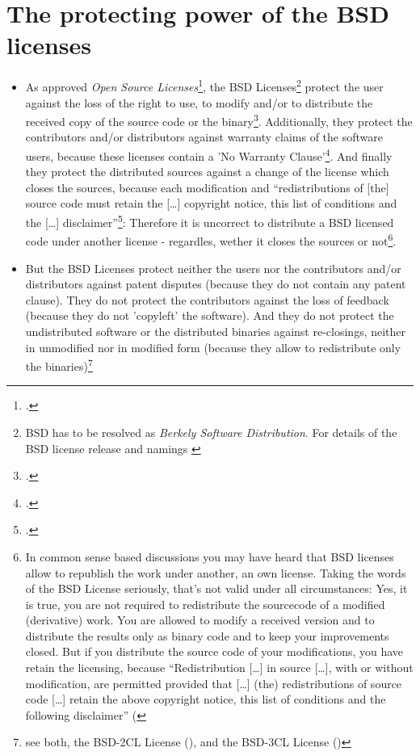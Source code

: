\section{The protecting power of the BSD licenses}
\begin{itemize}
  \item As approved \emph{Open Source Licenses}\footcite[cf.][\nopage
  wp]{OSI2012b}, the BSD Licenses\footnote{BSD has to be resolved as
  \emph{Berkely Software Distribution}. For details of the BSD license release
  and namings \cite[cf.][\nopage wp. editorial]{BsdLicense3Clause}} protect the
  user against the loss of the right to use, to modify and/or to distribute the
  received copy of the source code or the binary\footcite[cf.][\nopage wp
  §1ff]{OSI2012a}. Additionally, they protect the contributors and/or
  distributors against warranty claims of the software users, because these
  licenses contain a 'No Warranty Clause'\footcite[one for all version
  cf.][\nopage wp]{BsdLicense2Clause}. And finally they protect the distributed
  sources against a change of the license which closes the sources, because each
  modification and \enquote{redistributions of [the] source code must retain the
  [\ldots] copyright notice, this list of conditions and the [\ldots]
  disclaimer}\footcite[cf.][\nopage wp]{BsdLicense2Clause}: Therefore it is
  uncorrect to distribute a BSD licensed code under another license - regardles,
  wether it closes the sources or not\footnote{In common sense based discussions
  you may have heard that BSD licenses allow to republish the work under
  another, an own license. Taking the words of the BSD License seriously, that's
  not valid under all circumstances: Yes, it is true, you are not required to 
  redistribute the sourcecode of a modified (derivative) work. You are allowed 
  to modify a received version and to distribute the results only as binary code 
  and to keep your improvements closed. But if you distribute the source code of 
  your modifications, you have retain the licensing, because 
  \enquote{Redistribution [\ldots] in source [\ldots], with or without 
  modification, are permitted provided that [\ldots] (the) redistributions of 
  source code [\ldots] retain the above copyright notice, this list of 
  conditions and the following disclaimer} 
  (\cite[cf.][\nopage wp]{BsdLicense2Clause}}.
  
  \item But the BSD Licenses protect neither the users nor the contributors
  and/or distributors against patent disputes (because they do not contain any
  patent clause). They do not protect the contributors against the loss of
  feedback (because they do not 'copyleft' the software). And they do not
  protect the undistributed software or the distributed binaries against
  re-closings, neither in unmodified nor in modified form (because they allow to
  redistribute only the binaries)\footnote{see both, the BSD-2CL License
  (\cite[cf.][\nopage wp]{BsdLicense2Clause}), and the BSD-3CL License
  (\cite[cf.][\nopage wp]{BsdLicense3Clause})}
  
\end{itemize}

